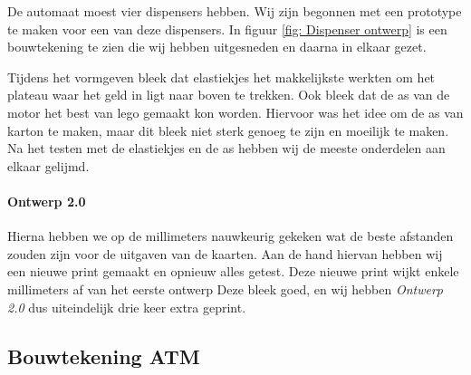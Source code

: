 \documentclass{article}
\begin{document}
De automaat moest vier dispensers hebben.
Wij zijn begonnen met een prototype te maken voor een van deze dispensers.
In figuur \ref{fig: Dispenser ontwerp} is een bouwtekening te zien die wij hebben uitgesneden en daarna in elkaar gezet.

Tijdens het vormgeven bleek dat elastiekjes het makkelijkste werkten om het plateau waar het geld in ligt naar boven te trekken.
Ook bleek dat de as van de motor het best van lego gemaakt kon worden.
Hiervoor was het idee om de as van karton te maken, maar dit bleek niet sterk genoeg te zijn en moeilijk te maken.
Na het testen met de elastiekjes en de as hebben wij de meeste onderdelen aan elkaar gelijmd.

\paragraph{Ontwerp 2.0}

Hierna hebben we op de millimeters nauwkeurig gekeken wat de beste afstanden zouden zijn voor de uitgaven van de kaarten.
Aan de hand hiervan hebben wij een nieuwe print gemaakt en opnieuw alles getest.
Deze nieuwe print wijkt enkele millimeters af van het eerste ontwerp
Deze bleek goed, en wij hebben \emph{Ontwerp 2.0} dus uiteindelijk drie keer extra geprint.

\subsection{Bouwtekening ATM}
\end{document}

